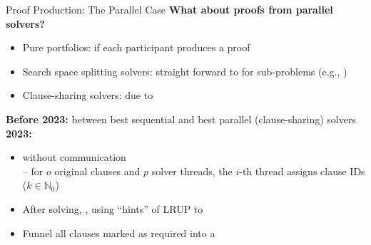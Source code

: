 \documentclass[t,english]{sdqbeamer}
\begin{document}
\begin{frame}{Proof Production: The Parallel Case}
	\textbf{What about proofs from parallel solvers?}
	\begin{itemize}
		\item Pure portfolios: \pause {} if each participant produces a proof
		\item Search space splitting solvers: \pause straight forward to  for sub-problems (e.g., \cite{heule2016solving})
		\item Clause-sharing solvers: \pause {} due to  \cite{heule2014validating}
	\end{itemize}
	
	\vspace*{2mm}
	\textbf{Before 2023:}  between best sequential and best parallel (clause-sharing) solvers\\[2mm]
	\pause
	\textbf{2023:}  \cite{michaelson2023unsatisfiability}
	\begin{itemize}
		\item {} without communication\\
		-- for $o$ original clauses and $p$ solver threads, the $i$-th thread assigns clause IDs  ($k \in \mathbb{N}_0$)
		\item After solving, , using ``hints'' of LRUP to 
		\item Funnel all clauses marked as required into a 
	\end{itemize}
\end{frame}
\end{document}
